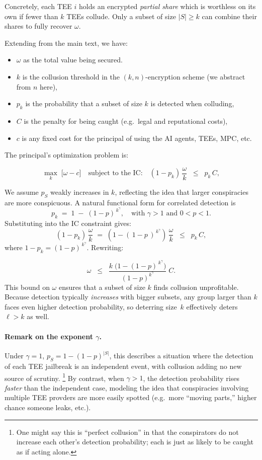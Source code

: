 \documentclass{article}
\begin{document}
Concretely, each TEE $i$ holds an encrypted \emph{partial share} which is worthless on its own if fewer than $k$ TEEs collude. Only a subset of size $|S|\!\ge k$ can combine their shares to fully recover $\omega$.

Extending from the main text, we have:
\begin{itemize}
  \item \(\omega\) as the total value being secured.
  \item \(k\) is the collusion threshold in the \((k,n)\)-encryption scheme (we abstract from \(n\) here),
  \item \(p_k\) is the probability that a subset of size \(k\) is detected when colluding,
  \item \(C\) is the penalty for being caught (e.g.\ legal and reputational costs),
  \item \(c\) is any fixed cost for the principal of using the AI agents, TEEs, MPC, etc.
\end{itemize}

The principal’s optimization problem is:

\[
  \max_{k} \;\bigl[\omega - c\bigr]
  \quad \text{subject to the IC:}
  \quad
  (1 - p_k)\,\frac{\omega}{k}
  \;\;\le\;\;
  p_k\,C,
\]

We assume $p_S$ weakly increases in $k$, reflecting the idea that larger conspiracies are more conspicuous. A natural functional form for correlated detection is
\[
  p_k
  \;=\;
  1 \;-\;(1 - p)^{\,k^\gamma},
  \quad \text{with } \gamma>1 \text{ and } 0 < p < 1.
\]
Substituting into the IC constraint gives:
\[
  (1 - p_k)\,\frac{\omega}{k}
  \;=\;
  (1 - (\,1 - p\,)^{\,k^\gamma}) \,\frac{\omega}{k}
  \;\;\le\;\;
  p_k\,C,
\]
where
\(
  1 - p_k = (1 - p)^{\,k^\gamma}.
\)
Rewriting:

\[
  \omega
  \;\;\le\;\;
  \frac{k\;\bigl(1 - (1-p)^{\,k^\gamma}\bigr)}{(1-p)^{k^\gamma}}\;C.
\]
This bound on \(\omega\) ensures that a subset of size \(k\) finds collusion
unprofitable.  Because detection typically \emph{increases} with bigger subsets,
any group larger than \(k\) faces even higher detection probability, so
deterring size~\(k\) effectively deters \(\ell>k\) as well.

\paragraph{Remark on the exponent \(\gamma\).}
Under \(\gamma = 1\), 
\(
  p_S = 1 - (1-p)^{|S|}
\),
this describes a situation where the detection of each TEE jailbreak is an independent event, with 
collusion adding no new source of scrutiny.
\footnote{One might say this is ``perfect collusion'' in that 
 the conspirators do not increase each other's detection probability; 
 each is just as likely to be caught as if acting alone.}
By contrast, when \(\gamma>1\), the detection probability 
rises \emph{faster} than the independent case, modeling the idea 
that conspiracies involving multiple TEE provders are more easily spotted 
(e.g.\ more “moving parts,” higher chance someone leaks, etc.).
\end{document}
